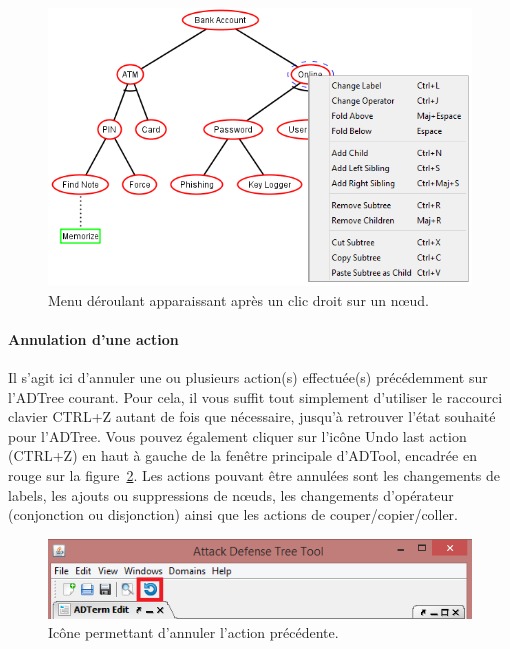    \begin{figure}[!h]
        \centering
        \includegraphics[height=0.7\textwidth]{figure/clicdroit.png}
        \caption{Menu déroulant apparaissant après un clic droit sur un n\oe{}ud.}
        \label{fig:clicdroit}
    \end{figure}

\paragraph{Annulation d'une action} Il s'agit ici d'annuler une ou plusieurs action(s) effectuée(s) précédemment sur l'ADTree courant. Pour cela, il vous suffit tout simplement d'utiliser le raccourci clavier {\sc CTRL+Z} autant de fois que nécessaire, jusqu'à retrouver l'état souhaité pour l'ADTree. Vous pouvez également cliquer sur l'icône \og Undo last action (CTRL+Z) \fg{} en haut à gauche de la fenêtre principale d'ADTool, encadrée en rouge sur la {\sc figure}~\ref{fig:undo}. Les actions pouvant être annulées sont les changements de labels, les ajouts ou suppressions de n\oe{}uds, les changements d'opérateur (conjonction ou disjonction) ainsi que les actions de couper/copier/coller.

\begin{figure}[!h]
        \centering
        \includegraphics[height=0.17\textwidth]{figure/undo.png}
        \caption{Icône permettant d'annuler l'action précédente.}
        \label{fig:undo}
    \end{figure}